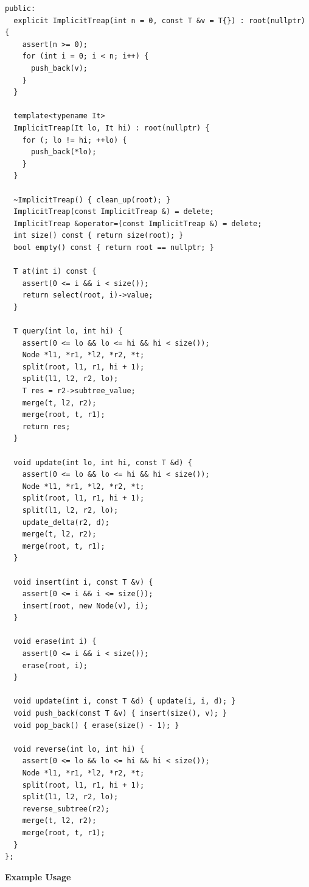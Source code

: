 \begin{lstlisting}[style=cpp]
 public:
  explicit ImplicitTreap(int n = 0, const T &v = T{}) : root(nullptr) {
    assert(n >= 0);
    for (int i = 0; i < n; i++) {
      push_back(v);
    }
  }

  template<typename It>
  ImplicitTreap(It lo, It hi) : root(nullptr) {
    for (; lo != hi; ++lo) {
      push_back(*lo);
    }
  }

  ~ImplicitTreap() { clean_up(root); }
  ImplicitTreap(const ImplicitTreap &) = delete;
  ImplicitTreap &operator=(const ImplicitTreap &) = delete;
  int size() const { return size(root); }
  bool empty() const { return root == nullptr; }

  T at(int i) const {
    assert(0 <= i && i < size());
    return select(root, i)->value;
  }

  T query(int lo, int hi) {
    assert(0 <= lo && lo <= hi && hi < size());
    Node *l1, *r1, *l2, *r2, *t;
    split(root, l1, r1, hi + 1);
    split(l1, l2, r2, lo);
    T res = r2->subtree_value;
    merge(t, l2, r2);
    merge(root, t, r1);
    return res;
  }

  void update(int lo, int hi, const T &d) {
    assert(0 <= lo && lo <= hi && hi < size());
    Node *l1, *r1, *l2, *r2, *t;
    split(root, l1, r1, hi + 1);
    split(l1, l2, r2, lo);
    update_delta(r2, d);
    merge(t, l2, r2);
    merge(root, t, r1);
  }

  void insert(int i, const T &v) {
    assert(0 <= i && i <= size());
    insert(root, new Node(v), i);
  }

  void erase(int i) {
    assert(0 <= i && i < size());
    erase(root, i);
  }

  void update(int i, const T &d) { update(i, i, d); }
  void push_back(const T &v) { insert(size(), v); }
  void pop_back() { erase(size() - 1); }

  void reverse(int lo, int hi) {
    assert(0 <= lo && lo <= hi && hi < size());
    Node *l1, *r1, *l2, *r2, *t;
    split(root, l1, r1, hi + 1);
    split(l1, l2, r2, lo);
    reverse_subtree(r2);
    merge(t, l2, r2);
    merge(root, t, r1);
  }
};
\end{lstlisting}
\textbf{Example Usage}\par
